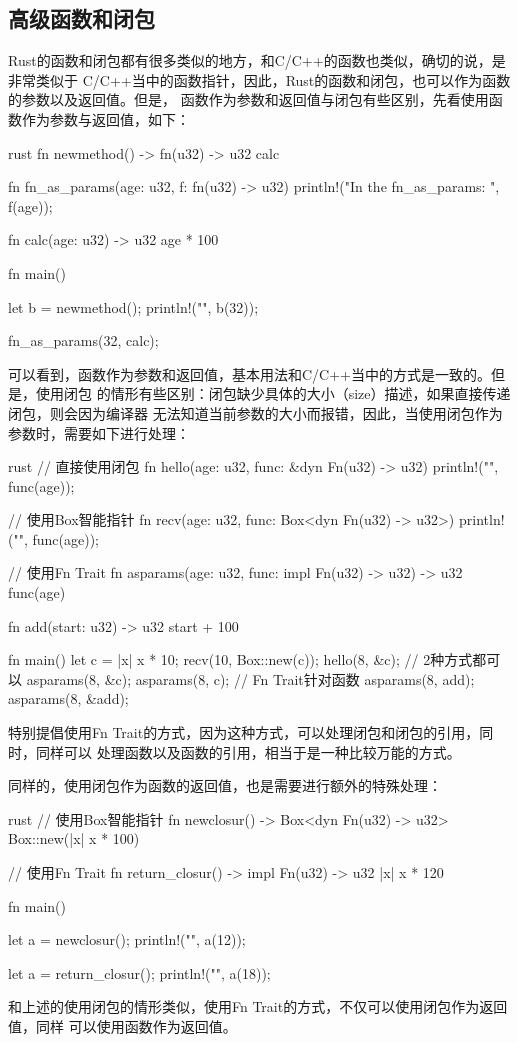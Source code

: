 \subsection{高级函数和闭包}
Rust的函数和闭包都有很多类似的地方，和C/C++的函数也类似，确切的说，是非常类似于
C/C++当中的函数指针，因此，Rust的函数和闭包，也可以作为函数的参数以及返回值。但是，
函数作为参数和返回值与闭包有些区别，先看使用函数作为参数与返回值，如下：
\begin{code-block}{rust}
fn newmethod() -> fn(u32) -> u32 {
    calc
}

fn fn_as_params(age: u32, f: fn(u32) -> u32) {
    println!("In the fn_as_params: {}", f(age));
}

fn calc(age: u32) -> u32 {
    age * 100
}

fn main() {
    let b = newmethod();
    println!("{}", b(32));

    fn_as_params(32, calc);
}
\end{code-block}
可以看到，函数作为参数和返回值，基本用法和C/C++当中的方式是一致的。但是，使用闭包
的情形有些区别：闭包缺少具体的大小（size）描述，如果直接传递闭包，则会因为编译器
无法知道当前参数的大小而报错，因此，当使用闭包作为参数时，需要如下进行处理：
\begin{code-block}{rust}
// 直接使用闭包
fn hello(age: u32, func: &dyn Fn(u32) -> u32) {
    println!("{}", func(age));
}

// 使用Box智能指针
fn recv(age: u32, func: Box<dyn Fn(u32) -> u32>) {
    println!("{}", func(age));
}

// 使用Fn Trait
fn asparams(age: u32, func: impl Fn(u32) -> u32) -> u32{
    func(age)
}

fn add(start: u32) -> u32 {
    start + 100
}

fn main() {
    let c = |x| x * 10;
    recv(10, Box::new(c));
    hello(8, &c);
    // 2种方式都可以
    asparams(8, &c);
    asparams(8, c);
    // Fn Trait针对函数
    asparams(8, add);
    asparams(8, &add);
}
\end{code-block}
特别提倡使用Fn Trait的方式，因为这种方式，可以处理闭包和闭包的引用，同时，同样可以
处理函数以及函数的引用，相当于是一种比较万能的方式。

同样的，使用闭包作为函数的返回值，也是需要进行额外的特殊处理：
\begin{code-block}{rust}
// 使用Box智能指针
fn newclosur() -> Box<dyn Fn(u32) -> u32> {
    Box::new(|x| x * 100)
}

// 使用Fn Trait
fn return_closur() -> impl Fn(u32) -> u32 {
    |x| x * 120
}

fn main() {
    let a = newclosur();
    println!("{}", a(12));

    let a = return_closur();
    println!("{}", a(18));
}
\end{code-block}
和上述的使用闭包的情形类似，使用Fn Trait的方式，不仅可以使用闭包作为返回值，同样
可以使用函数作为返回值。

